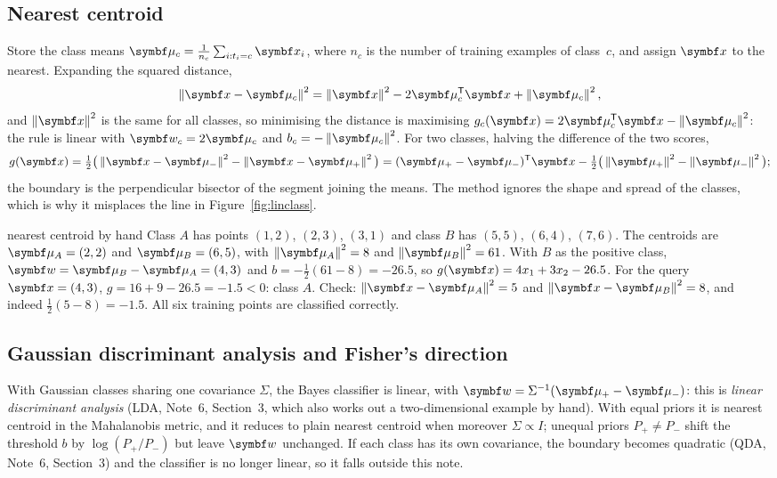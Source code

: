 \documentclass[11pt]{article}
\newcommand{\w}{\vect{w}}
\begin{document}
\subsection{Nearest centroid}

Store the class means $\vmu_c = \frac{1}{n_c}\sum_{i : t_i = c} \x_i$, where $n_c$ is the number of training examples of
class~$c$, and assign $\x$ to the nearest. Expanding the
squared distance,
\[
  \norm{\x - \vmu_c}^2 = \norm{\x}^2 - 2\vmu_c\T\x + \norm{\vmu_c}^2 ,
\]
and $\norm{\x}^2$ is the same for all classes, so minimising the distance is maximising $g_c(\x) = 2\vmu_c\T\x -
\norm{\vmu_c}^2$: the rule is linear with $\w_c = 2\vmu_c$ and $b_c = -\norm{\vmu_c}^2$. For two classes, halving the
difference of the two scores,
\[
  g(\x) = \tfrac12\big(\norm{\x - \vmu_-}^2 - \norm{\x - \vmu_+}^2\big) = (\vmu_+ - \vmu_-)\T\x
  - \tfrac12\big(\norm{\vmu_+}^2 - \norm{\vmu_-}^2\big) ;
\]
the boundary is the perpendicular bisector of the segment joining the means. The method ignores the shape and spread
of the classes, which is why it misplaces the line in Figure~\ref{fig:linclass}.

\begin{worked}{nearest centroid by hand}
Class $A$ has points $(1, 2)$, $(2, 3)$, $(3, 1)$ and class $B$ has $(5, 5)$, $(6, 4)$, $(7, 6)$. The centroids are
$\vmu_A = (2, 2)$ and $\vmu_B = (6, 5)$, with $\norm{\vmu_A}^2 = 8$ and $\norm{\vmu_B}^2 = 61$. With $B$ as the positive
class, $\w = \vmu_B - \vmu_A = (4, 3)$ and $b = -\frac12(61 - 8) = -26.5$, so $g(\x) = 4x_1 + 3x_2 - 26.5$. For the query
$\x = (4, 3)$, $g = 16 + 9 - 26.5 = -1.5 < 0$: class $A$. Check: $\norm{\x - \vmu_A}^2 = 5$ and $\norm{\x - \vmu_B}^2 = 8$,
and indeed $\frac12(5 - 8) = -1.5$. All six training points are classified correctly.
\end{worked}

\subsection{Gaussian discriminant analysis and Fisher's direction}

With Gaussian classes sharing one covariance $\Sigma$, the Bayes classifier is linear, with $\w = \Sigma^{-1}(\vmu_+ -
\vmu_-)$: this is \emph{linear discriminant analysis} (LDA, Note~6, Section~3, which also works out a two-dimensional
example by hand). With equal priors it is nearest centroid in the Mahalanobis metric, and it reduces to plain nearest
centroid when moreover $\Sigma \propto I$; unequal priors $P_+ \ne P_-$ shift the threshold $b$ by $\log(P_+/P_-)$ but
leave $\w$ unchanged. If each class has its own covariance, the boundary becomes quadratic (QDA, Note~6, Section~3) and
the classifier is no longer linear, so it falls outside this note.
\end{document}
